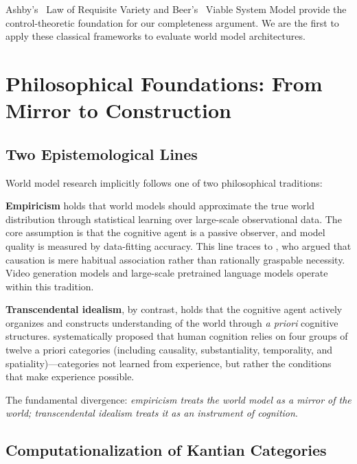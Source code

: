 \documentclass[11pt,a4paper]{article}
\begin{document}
Ashby's~\citeyearpar{ashby1956cybernetics} Law of Requisite Variety and Beer's~\citeyearpar{beer1979heart} Viable System Model provide the control-theoretic foundation for our completeness argument. We are the first to apply these classical frameworks to evaluate world model architectures.

\section{Philosophical Foundations: From Mirror to Construction}\label{sec:philosophy}

\subsection{Two Epistemological Lines}

World model research implicitly follows one of two philosophical traditions:

\textbf{Empiricism} holds that world models should approximate the true world distribution through statistical learning over large-scale observational data. The core assumption is that the cognitive agent is a passive observer, and model quality is measured by data-fitting accuracy. This line traces to \citet{hume1739treatise}, who argued that causation is mere habitual association rather than rationally graspable necessity. Video generation models and large-scale pretrained language models operate within this tradition.

\textbf{Transcendental idealism}, by contrast, holds that the cognitive agent actively organizes and constructs understanding of the world through \emph{a priori} cognitive structures. \citet{kant1781critique} systematically proposed that human cognition relies on four groups of twelve a priori categories (including causality, substantiality, temporality, and spatiality)---categories not learned from experience, but rather the conditions that make experience possible.

The fundamental divergence: \emph{empiricism treats the world model as a mirror of the world; transcendental idealism treats it as an instrument of cognition}.

\subsection{Computationalization of Kantian Categories}\label{sec:kant}
\end{document}
